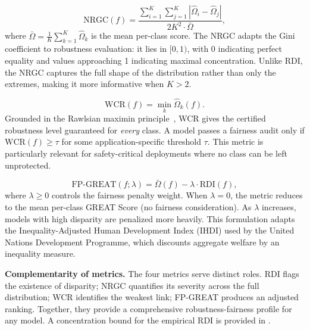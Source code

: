 \begin{definition}
\label{def:nrgc}
\begin{equation}
    \mathrm{NRGC}(f) = \frac{\displaystyle\sum_{i=1}^{K}\sum_{j=1}^{K} |\hat{\Omega}_i - \hat{\Omega}_j|}{2K^2 \cdot \bar{\Omega}},
    \label{eq:nrgc}
\end{equation}
where $\bar{\Omega} = \frac{1}{K}\sum_{k=1}^{K} \hat{\Omega}_k$ is the mean per-class score. The NRGC adapts the Gini coefficient to robustness evaluation: it lies in $[0, 1)$, with 0 indicating perfect equality and values approaching 1 indicating maximal concentration. Unlike RDI, the NRGC captures the full shape of the distribution rather than only the extremes, making it more informative when $K > 2$.
\end{definition}

\begin{definition}
\label{def:wcr}
\begin{equation}
    \mathrm{WCR}(f) = \min_{k} \hat{\Omega}_k(f).
    \label{eq:wcr}
\end{equation}
Grounded in the Rawlsian maximin principle~\citep{rawls1971theory}, WCR gives the certified robustness level guaranteed for \emph{every} class. A model passes a fairness audit only if $\mathrm{WCR}(f) \geq \tau$ for some application-specific threshold $\tau$. This metric is particularly relevant for safety-critical deployments where no class can be left unprotected.
\end{definition}

\begin{definition}
\label{def:fp_great}
\begin{equation}
    \mathrm{FP\text{-}GREAT}(f; \lambda) = \bar{\Omega}(f) - \lambda \cdot \mathrm{RDI}(f),
    \label{eq:fp_great}
\end{equation}
where $\lambda \geq 0$ controls the fairness penalty weight. When $\lambda = 0$, the metric reduces to the mean per-class GREAT Score (no fairness consideration). As $\lambda$ increases, models with high disparity are penalized more heavily. This formulation adapts the Inequality-Adjusted Human Development Index (IHDI) used by the United Nations Development Programme, which discounts aggregate welfare by an inequality measure.
\end{definition}

\textbf{Complementarity of metrics.} The four metrics serve distinct roles. RDI flags the existence of disparity; NRGC quantifies its severity across the full distribution; WCR identifies the weakest link; FP-GREAT produces an adjusted ranking. Together, they provide a comprehensive robustness-fairness profile for any model. A concentration bound for the empirical RDI is provided in .

